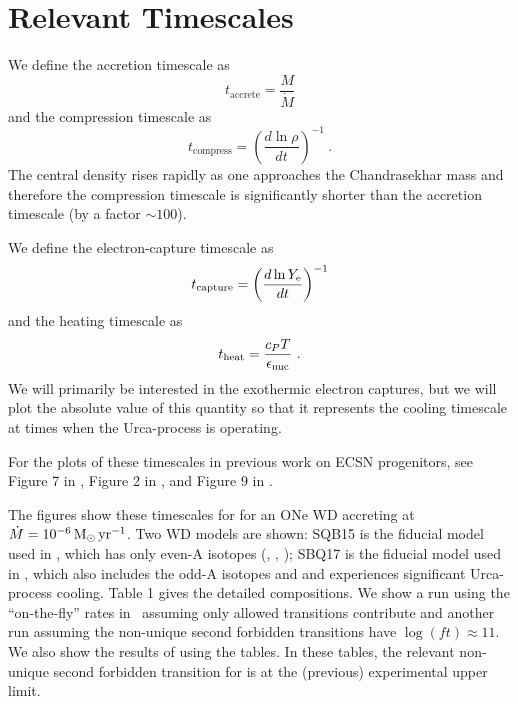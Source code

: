\documentclass[modern]{aastex62}
\begin{document}


\section{Relevant Timescales}

We define the accretion timescale as
\begin{equation}
  t_{\mathrm{accrete}} = \frac{M}{\dot{M}}
\end{equation}
and the compression timescale as
\begin{equation}
  \label{eq:tcompress}
  t_{\mathrm{compress}} = \left(\frac{d \ln \rho}{dt} \right)^{-1}~.
\end{equation}
The central density rises rapidly as one approaches the Chandrasekhar
mass and therefore the compression timescale is significantly shorter
than the accretion timescale (by a factor $\sim 100$).


We define the electron-capture timescale as
\begin{equation}
  \label{eq:tcapture}
  t_{\mathrm{capture}} = \left(\frac{d \ln Y_{\rm e}}{dt} \right)^{-1}
\end{equation}
and the heating timescale as
\begin{equation}
  \label{eq:cooling}
  t_{\mathrm{heat}} = \frac{c_P T}{\epsilon_{\mathrm{nuc}}} ~.
\end{equation}
We will primarily be interested in the exothermic electron captures,
but we will plot the absolute value of this quantity so that it
represents the cooling timescale at times when the Urca-process is
operating.


For the plots of these timescales in previous work on ECSN
progenitors, see Figure 7 in \citet{Miyaji1980}, Figure 2 in
\citet{Miyaji1987}, and Figure 9 in \citet{Takahashi2013}.

The figures show these timescales for for an ONe WD accreting at
$\dot{M} = 10^{-6}\,\mathrm{M}_\odot\,\mathrm{yr}^{-1}$.  Two WD models are shown: SQB15 is the
fiducial model used in \citet{Schwab2015}, which has only even-A
isotopes (\oxygen[16], \neon[20], \magnesium[24]); SBQ17 is the
fiducial model used in \citet{Schwab2017a}, which also includes the
odd-A isotopes \sodium[23] and \magnesium[25] and experiences
significant Urca-process cooling.  Table 1 gives the detailed
compositions.  We show a run using the ``on-the-fly'' rates in \MESA\
assuming only allowed transitions contribute and another run assuming
the non-unique second forbidden transitions have
$\log(ft) \approx 11$.  We also show the results of using the
\citet{Suzuki2016a} tables.  In these tables, the relevant non-unique
second forbidden transition for \neon[20] is at the (previous)
experimental upper limit.
\end{document}
